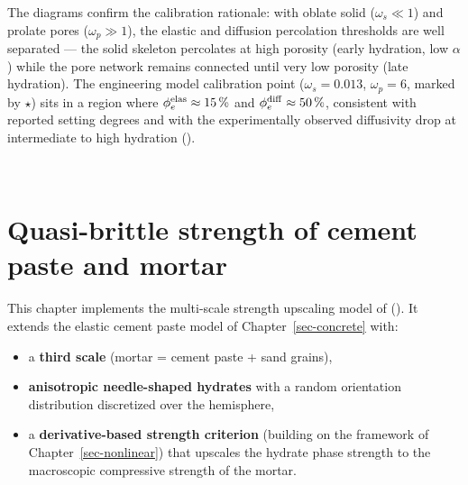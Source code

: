 \documentclass[
  a4paper,
  numbers=noendperiod,
  DIV=12]{scrreprt}
\providecommand{\tightlist}{%
  \setlength{\itemsep}{0pt}\setlength{\parskip}{0pt}}
\begin{document}
The diagrams confirm the calibration rationale: with oblate solid
(\(\omega_s \ll 1\)) and prolate pores (\(\omega_p \gg 1\)), the elastic
and diffusion percolation thresholds are well separated --- the solid
skeleton percolates at high porosity (early hydration, low \(\alpha\))
while the pore network remains connected until very low porosity (late
hydration). The engineering model calibration point
(\(\omega_s = 0.013\), \(\omega_p = 6\), marked by \(\star\)) sits in a
region where \(\phi_e^{\rm elas} \approx 15\,\%\) and
\(\phi_e^{\rm diff} \approx 50\,\%\), consistent with reported setting
degrees and with the experimentally observed diffusivity drop at
intermediate to high hydration ().

\(\,\)

\chapter{Quasi-brittle strength of cement paste and
mortar}\label{sec-concrete-strength}

\begin{tcolorbox}[enhanced jigsaw, arc=.35mm, bottomrule=.15mm, bottomtitle=1mm, breakable, colback=white, colbacktitle=quarto-callout-important-color!10!white, colframe=quarto-callout-important-color-frame, coltitle=black, left=2mm, leftrule=.75mm, opacityback=0, opacitybacktitle=0.6, rightrule=.15mm, title={Objectives}, titlerule=0mm, toprule=.15mm, toptitle=1mm]

This chapter implements the multi-scale strength upscaling model of
(). It extends the
elastic cement paste model of Chapter~\ref{sec-concrete} with:

\begin{itemize}
\tightlist
\item
  a \textbf{third scale} (mortar = cement paste + sand grains),
\item
  \textbf{anisotropic needle-shaped hydrates} with a random orientation
  distribution discretized over the hemisphere,
\item
  a \textbf{derivative-based strength criterion} (building on the
  framework of Chapter~\ref{sec-nonlinear}) that upscales the hydrate
  phase strength to the macroscopic compressive strength of the mortar.
\end{itemize}

\end{tcolorbox}
\end{document}
